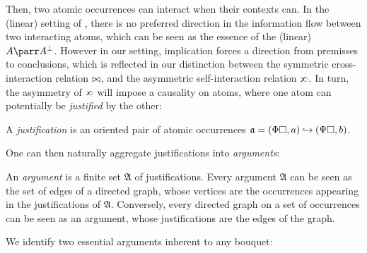 Then, two atomic occurrences can interact when their contexts can. In the
(linear)  setting of \cite{lmcs:1089}, there is no preferred direction
in the information flow between two interacting atoms, which can be seen as the
essence of the (linear)  $A \parr A^\bot$. However in our
 setting, implication forces a direction from premisses to
conclusions, which is reflected in our distinction between the symmetric
cross-interaction relation $\mathbin{\bowtie}$, and the asymmetric self-interaction
relation $\sinter$. In turn, the asymmetry of
$\sinter$ will impose a causality on atoms, where one atom can potentially be
\emph{justified} by the other:

\begin{definition}[Justification]
  
  A \emph{justification} is an oriented pair of atomic occurrences $\mathfrak{a}
  = (\Phi\square, a) \mathbin{\hookrightarrow} (\Psi\square, b)$.
\end{definition}

One can then naturally aggregate justifications into \emph{arguments}:

\begin{definition}[Argument]
  
  An \emph{argument} is a finite set $\mathfrak{A}$ of justifications. Every
  argument $\mathfrak{A}$ can be seen as the set of edges of a directed graph,
  whose vertices are the occurrences appearing in the justifications of
  $\mathfrak{A}$. Conversely, every directed graph on a set of occurrences can
  be seen as an argument, whose justifications are the edges of the graph.
\end{definition}

We identify two essential arguments inherent to any bouquet:

